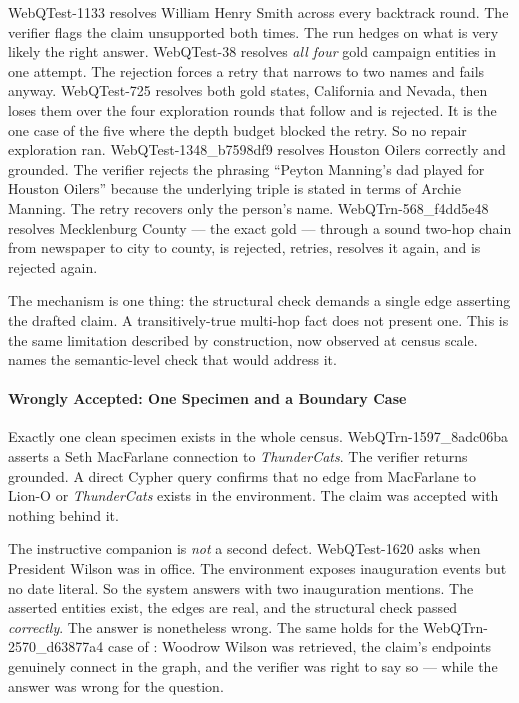 \textsf{WebQTest-1133} resolves \textsf{William Henry Smith} across every
backtrack round. The verifier flags the claim unsupported both times. The run
hedges on what is very likely the right answer. \textsf{WebQTest-38} resolves
\emph{all four} gold campaign entities in one attempt. The rejection forces a
retry that narrows to two names and fails anyway. \textsf{WebQTest-725} resolves
both gold states, California and Nevada, then loses them over the four
exploration rounds that follow and is rejected. It is the one case of the five
where the depth budget blocked the retry. So no repair exploration ran.
\textsf{WebQTest-1348\_b7598df9} resolves \textsf{Houston Oilers} correctly and
grounded. The verifier rejects the phrasing ``Peyton Manning's dad played for
Houston Oilers'' because the underlying triple is stated in terms of Archie
Manning. The retry recovers only the person's name.
\textsf{WebQTrn-568\_f4dd5e48} resolves \textsf{Mecklenburg County} --- the
exact gold --- through a sound two-hop chain from newspaper to city to county,
is rejected, retries, resolves it again, and is rejected again.

The mechanism is one thing: the structural check demands a single edge asserting
the drafted claim. A transitively-true multi-hop fact does not present one.
This is the same limitation  described by
construction, now observed at census scale.  names the
semantic-level check that would address it.

\paragraph{Wrongly Accepted: One Specimen and a Boundary Case}

Exactly one clean specimen exists in the whole census.
\textsf{WebQTrn-1597\_8adc06ba} asserts a Seth MacFarlane connection to
\emph{ThunderCats}. The verifier returns \textsf{grounded}. A direct Cypher
query confirms that no edge from MacFarlane to Lion-O or \emph{ThunderCats}
exists in the environment. The claim was accepted with nothing behind it.

The instructive companion is \emph{not} a second defect. \textsf{WebQTest-1620}
asks when President Wilson was in office. The environment exposes inauguration
events but no date literal. So the system answers with two inauguration
mentions. The asserted entities exist, the edges are real, and the structural
check passed \emph{correctly}. The answer is nonetheless wrong. The same holds
for the \textsf{WebQTrn-2570\_d63877a4} case of :
Woodrow Wilson was retrieved, the claim's endpoints genuinely connect in the
graph, and the verifier was right to say so --- while the answer was wrong for
the question.


